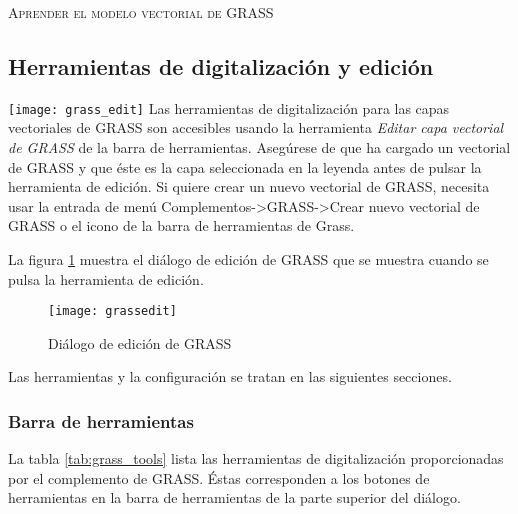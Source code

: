 \begin{Tip}\caption{\textsc{Aprender el modelo vectorial de GRASS}}
\end{Tip} 

\subsection{Herramientas de digitalización y edición}
\label{grass_digitising}

\texttt{[image: grass\_edit]} Las herramientas de digitalización para las capas vectoriales de GRASS son accesibles usando la herramienta \textsl{Editar capa vectorial de GRASS} de la barra de herramientas. Asegúrese de que ha cargado un vectorial de GRASS y que éste es la capa seleccionada en la leyenda antes de pulsar la herramienta de edición. Si quiere crear un nuevo vectorial de GRASS, necesita usar la entrada de menú Complementos->GRASS->Crear nuevo vectorial de GRASS o el icono de la barra de herramientas de Grass.

La figura \ref{fig:grass_edit} muestra el diálogo de edición de GRASS que se muestra cuando se pulsa la herramienta de edición.

\begin{figure}[h]
   \begin{center}
   \caption{Diálogo de edición de GRASS}\label{fig:grass_edit}\smallskip
   \texttt{[image: grassedit]}
\end{center}  
\end{figure}

Las herramientas y la configuración se tratan en las siguientes secciones.

\subsubsection{Barra de herramientas}\label{label_grasstoolbar}

La tabla \ref{tab:grass_tools} lista las herramientas de digitalización proporcionadas por el complemento de GRASS. Éstas corresponden a los botones de herramientas en la barra de herramientas de la parte superior del diálogo.

